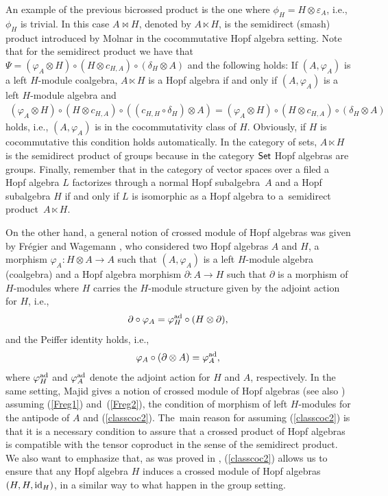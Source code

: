 \documentclass[10pt,a4paper]{amsart}
\numberwithin{equation}{section}
\newcommand{\ot}{\otimes}
\newcommand{\co}{\circ}
\begin{document}
\begin{Remark}
An example of the previous bicrossed product is the one where $\phi_{H}= H\otimes\varepsilon_{A}$, i.e., $\phi_{H}$ is trivial. In this case $A\bowtie H$, denoted by $A\ltimes H$, is the semidirect (smash) product introduced by Molnar \cite{Molnar} in the cocommutative Hopf algebra setting. Note that for the semidirect product we have that $\Psi=(\varphi_{A}\otimes H)\circ (H\otimes c_{H,A})\circ (\delta_{H}\otimes A)$ and the following holds: If $(A,\varphi_{A})$ is a left $H$-module coalgebra, $A\ltimes H$ is a Hopf algebra if and only if $(A,\varphi_{A})$ is a left $H$-module algebra and
\begin{gather}\label{classcoc2}
	(\varphi_{A}\otimes H)\circ(H\otimes c_{H,A})\circ((c_{H,H}\circ\delta_{H})\otimes A)=(\varphi_{A}\otimes H)\circ(H\otimes c_{H,A})\circ(\delta_{H}\otimes A)
\end{gather}
holds, i.e., $(A,\varphi_{A})$ is in the cocommutativity class of $H$. Obviously, if $H$ is cocommutative this condition holds automatically. In the category of sets, $A\ltimes H$ is the semidirect product of groups because in the category ${\sf Set}$ Hopf algebras are groups. Finally, remember that in the category of vector spaces over a filed a Hopf algebra $L$ factorizes through a normal Hopf subalgebra~$A$
and a Hopf subalgebra $H$ if and only if $L$ is isomorphic as a Hopf algebra to a~semidirect product~${A\ltimes H}$.

On the other hand, a general notion of crossed module of Hopf algebras was given by Fr\'egier and Wagemann \cite{FW}, who considered two Hopf algebras $A$ and $H$, a morphism $\varphi_A\colon H\ot A\rightarrow A$ such that $(A, \varphi_A)$ is a left $H$-module algebra (coalgebra) and a Hopf algebra morphism $\partial\colon A\rightarrow H$ such that $\partial$ is a morphism of $H$-modules where $H$ carries the $H$-module structure given by the adjoint action for $H$, i.e.,
\begin{equation}
	\label{Freg1}
	\partial\co \varphi_A=\varphi_{H}^{{\rm ad}}\co (H\ot \partial),
\end{equation}
and the Peiffer identity holds, i.e.,
\begin{equation}
	\label{Freg2}
	\varphi_A\co (\partial\ot A)=\varphi_{A}^{{\rm ad}},
\end{equation}
where $\varphi^{{\rm ad}}_{H}$ and $\varphi^{{\rm ad}}_{A}$ denote the adjoint action for $H$ and $A$, respectively. In the same setting, Majid \cite{MA2} gives a notion of crossed module of Hopf algebras (see also \cite{Faria}) assuming (\ref{Freg1}) and~(\ref{Freg2}), the condition of morphism of left $H$-modules for the antipode of $A$ and (\ref{classcoc2}). The~main reason for assuming (\ref{classcoc2}) is that it is a necessary condition to assure that a crossed product of Hopf algebras is compatible with the tensor coproduct in the sense of the semidirect product. We also want to emphasize that, as was proved in \cite{TAC}, (\ref{classcoc2}) allows us to ensure that any Hopf algebra $H$ induces a crossed module of Hopf algebras $(H,H,{\rm id}_H)$, in a similar way to what happen in the group setting.
\end{Remark}
\end{document}
